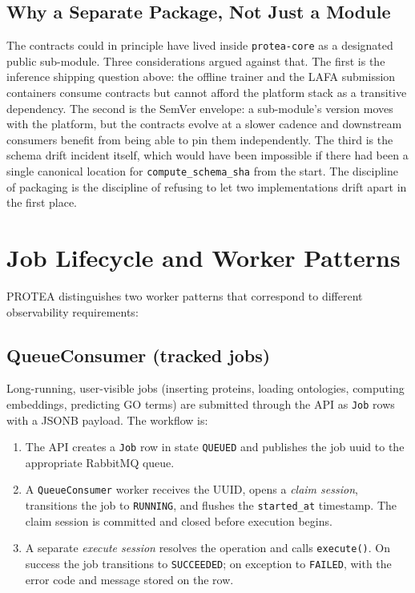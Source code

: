 \subsection{Why a Separate Package, Not Just a Module}
\label{subsec:contracts-rationale}

The contracts could in principle have lived inside \texttt{protea-core}
as a designated public sub-module. Three considerations argued against
that. The first is the inference shipping question above: the offline
trainer and the LAFA submission containers consume contracts but cannot
afford the platform stack as a transitive dependency. The second is the
SemVer envelope: a sub-module's version moves with the platform, but the
contracts evolve at a slower cadence and downstream consumers benefit
from being able to pin them independently. The third is the schema drift
incident itself, which would have been impossible if there had been a
single canonical location for \texttt{compute\_schema\_sha} from the
start. The discipline of packaging is the discipline of refusing to let
two implementations drift apart in the first place.

\section{Job Lifecycle and Worker Patterns}
\label{sec:job-lifecycle}

PROTEA distinguishes two worker patterns that correspond to different
observability requirements:

\subsection{QueueConsumer (tracked jobs)}
\label{subsec:queue-consumer}

Long-running, user-visible jobs (inserting proteins, loading ontologies,
computing embeddings, predicting GO terms) are submitted through the API as
\texttt{Job} rows with a JSONB payload. The workflow is:

\begin{enumerate}
  \item The API creates a \texttt{Job} row in state \texttt{QUEUED} and publishes
    the job \gls{uuid} to the appropriate RabbitMQ queue.
  \item A \texttt{QueueConsumer} worker receives the UUID, opens a
    \textit{claim session}, transitions the job to \texttt{RUNNING}, and flushes
    the \texttt{started\_at} timestamp. The claim session is committed and closed
    before execution begins.
  \item A separate \textit{execute session} resolves the operation and calls
    \texttt{execute()}. On success the job transitions to \texttt{SUCCEEDED}; on
    exception to \texttt{FAILED}, with the error code and message stored on the
    row.
\end{enumerate}

